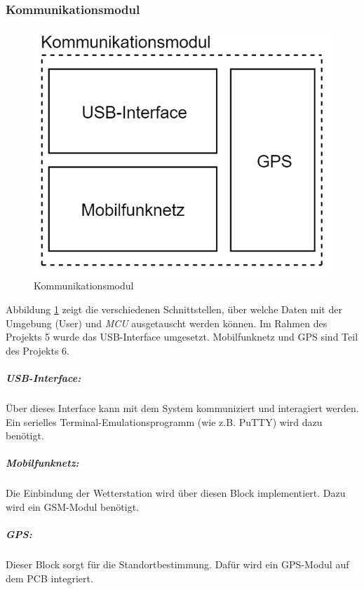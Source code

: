 \subsubsection{Kommunikationsmodul}
\begin{figure}[h]
\centering
\includegraphics[scale=0.7]{graphics/Konzeptdiagramme/Kommunikationsmodul.PNG}
\caption{Kommunikationsmodul}
\label{fig:kommunikationsmodul}
\end{figure}
Abbildung \ref{fig:kommunikationsmodul} zeigt die verschiedenen Schnittstellen, über welche Daten mit der Umgebung (User) und \textit{MCU} ausgetauscht werden können. Im Rahmen des Projekts 5 wurde das USB-Interface umgesetzt. Mobilfunknetz und GPS sind Teil des Projekts 6.\\

\subparagraph{USB-Interface:}
Über dieses Interface kann mit dem System kommuniziert und interagiert werden. Ein serielles Terminal-Emulationsprogramm (wie z.B. PuTTY) wird dazu benötigt.\\

\subparagraph{Mobilfunknetz:}
Die Einbindung der Wetterstation wird über diesen Block implementiert. Dazu wird ein GSM-Modul benötigt.\\

\subparagraph{GPS:}
Dieser Block sorgt für die Standortbestimmung. Dafür wird ein GPS-Modul auf dem PCB integriert.\\